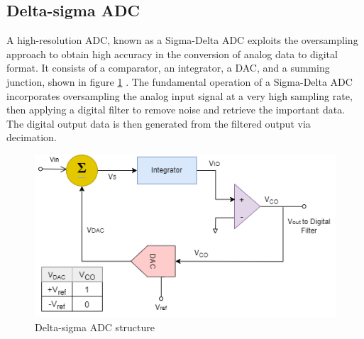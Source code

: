 \subsection{Delta-sigma ADC}
A high-resolution ADC, known as a Sigma-Delta ADC exploits the oversampling approach to obtain high accuracy in the conversion of analog data to digital format. It consists of a comparator, an integrator, a DAC, and a summing junction, shown in figure \ref{fig:x Delta-sigma ADC} . The fundamental operation of a Sigma-Delta ADC incorporates oversampling the analog input signal at a very high sampling rate, then applying a digital filter to remove noise and retrieve the important data. The digital output data is then generated from the filtered output via decimation.

\begin{figure}[htbp]
\centering
\includegraphics[scale=0.6]{images/Sigma.png}
\caption{Delta-sigma ADC structure}
\label{fig:x Delta-sigma ADC}
\end{figure}





